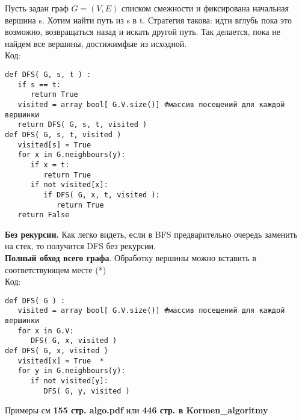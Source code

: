 Пусть задан граф $G = (V,E)$ списком смежности и фиксирована начальная вершина s. Хотим найти путь из s в t. Стратегия такова: идти вглубь пока это возможно, возвращаться назад и искать другой путь. Так делается, пока не найдем все вершины, достижимфые из исходной.\\
Код:\\
\begin{verbatim}
def DFS( G, s, t ) :
   if s == t:
      return True
   visited = array bool[ G.V.size()] #массив посещений для каждой вершинки
   return DFS( G, s, t, visited )
def DFS( G, s, t, visited )
   visited[s] = True
   for x in G.neighbours(y):
      if x = t:
         return True
      if not visited[x]:
         if DFS( G, x, t, visited ):
            return True
   return False
\end{verbatim}
{\bf Без рекурсии.} Как легко видеть, если в BFS предварительно очередь заменить на стек, то получится DFS без рекурсии.\\
{\bf Полный обход всего графа}. Обработку вершины можно вставить в соответствующем месте (*)\\
Код:
\begin{verbatim}
def DFS( G ) :
   visited = array bool[ G.V.size()] #массив посещений для каждой вершинки
   for x in G.V:
      DFS( G, x, visited )
def DFS( G, x, visited )
   visited[x] = True  *
   for y in G.neighbours(y):
      if not visited[y]:
         DFS( G, y, visited )
\end{verbatim}
Примеры см {\bf 155 стр. algo.pdf} или {\bf 446 стр. в Kormen\_algoritmy}

